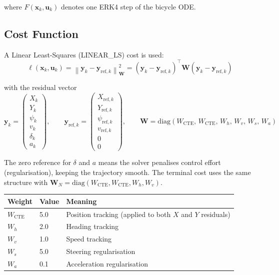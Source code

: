 \documentclass[11pt]{article}
\begin{document}
where $F(\bm{x}_k, \bm{u}_k)$ denotes one ERK4 step of the bicycle ODE.

\subsection{Cost Function}

A Linear Least-Squares (LINEAR\_LS) cost is used:
\[
\ell(\bm{x}_k, \bm{u}_k)
  = \left\|\bm{y}_k - \bm{y}_{\text{ref},k}\right\|_{\bm{W}}^2
  = \left(\bm{y}_k - \bm{y}_{\text{ref},k}\right)^{\!\top}
    \bm{W}
    \left(\bm{y}_k - \bm{y}_{\text{ref},k}\right)
\]

with the residual vector
\[
\bm{y}_k = \begin{pmatrix} X_k \\ Y_k \\ \psi_k \\ v_k \\ \delta_k \\ a_k \end{pmatrix},
\qquad
\bm{y}_{\text{ref},k} = \begin{pmatrix} X_{\text{ref},k} \\ Y_{\text{ref},k} \\ \psi_{\text{ref},k} \\ v_{\text{ref},k} \\ 0 \\ 0 \end{pmatrix},
\qquad
\bm{W} = \mathrm{diag}(W_{\text{CTE}},\, W_{\text{CTE}},\, W_h,\, W_v,\, W_s,\, W_a)
\]

The zero reference for $\delta$ and $a$ means the solver penalises control effort
(regularisation), keeping the trajectory smooth.  The terminal cost uses the
same structure with $\bm{W}_N = \mathrm{diag}(W_{\text{CTE}}, W_{\text{CTE}}, W_h, W_v)$.

\medskip
\begin{center}
\begin{tabular}{lll}
\toprule
Weight & Value & Meaning \\
\midrule
$W_{\text{CTE}}$ & 5.0 & Position tracking (applied to both $X$ and $Y$ residuals) \\
$W_h$            & 2.0 & Heading tracking \\
$W_v$            & 1.0 & Speed tracking \\
$W_s$            & 5.0 & Steering regularisation \\
$W_a$            & 0.1 & Acceleration regularisation \\
\bottomrule
\end{tabular}
\end{center}
\end{document}
